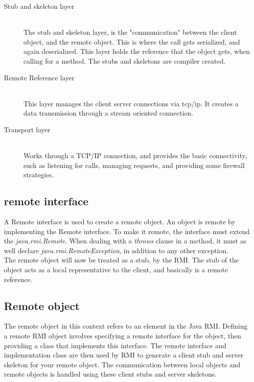 \begin{description}
 \item[Stub and skeleton layer] \hfill \\
The stub and skeleton layer, is the "communication" between the client object, and the remote object. This is where the call gets serialized, and again deserialized. This layer holds the reference that the object gets, when calling for a method. The stubs and skeletons are compiler created.

 \item[Remote Reference layer] \hfill \\

This layer manages the client server connections via tcp/ip. It creates a data transmission through a stream oriented connection.

 \item[Transport layer] \hfill \\

Works through a TCP/IP connection, and provides the basic connectivity, such as listening for calls, managing requests, and providing some firewall strategies.
\end{description}

\subsection{remote interface}
A Remote interface is used to create a remote object. An object is remote by implementing the Remote interface. To make it remote, the interface must extend the \emph{java.rmi.Remote}. When dealing with a \emph{throws} clause in a method, it must as well declare \emph{java.rmi.RemoteException}, in addition to any other exception.\\

The remote object will now be treated as a stub, by the RMI. The stub of the object acts as a local representative to the client, and basically is a remote reference.


\subsection{Remote object}
The remote object in this context refers to an element in the Java RMI. Defining a remote RMI object involves specifying a remote interface for the object, then providing a class that implements this interface. The remote interface and implementation class are then used by RMI to generate a client stub and server skeleton for your remote object. The communication between local objects and remote objects is handled using these client stubs and server skeletons.

